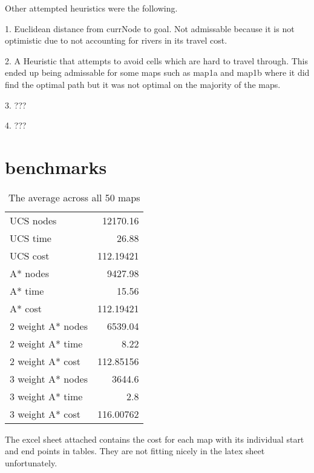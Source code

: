\documentclass[11pt]{article} %
\begin{document}
Other attempted heuristics were the following.

1. Euclidean distance from currNode to goal. Not admissable because it is not optimistic due to not accounting for rivers in its travel cost.

2. A Heuristic that attempts to avoid cells which are hard to travel through. This ended up being admissable for some maps such as map1a and map1b where it did find the optimal path but it was not optimal on the majority of the maps.

3. ???

4. ???

\section{benchmarks}
\begin{table}[htbp]
  \centering
  \caption{The average across all 50 maps}
    \begin{tabular}{lr}
    UCS nodes & 12170.16 \\
    UCS time & 26.88 \\
    UCS cost & 112.19421 \\
    A* nodes & 9427.98 \\
    A* time & 15.56 \\
    A* cost & 112.19421 \\
    2 weight A* nodes & 6539.04 \\
    2 weight A* time & 8.22 \\
    2 weight A* cost & 112.85156 \\
    3 weight A* nodes & 3644.6 \\
    3 weight A* time & 2.8 \\
    3 weight A* cost & 116.00762 \\
    \end{tabular}%
  \label{tab:addlabel}%
\end{table}%



The excel sheet attached contains the cost for each map with its individual start and end points in tables. They are not fitting nicely in the latex sheet unfortunately. 
\end{document}
